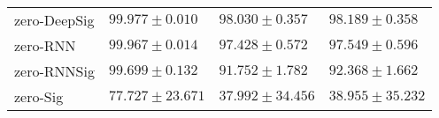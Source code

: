 \begin{tabular}{llll}
zero-DeepSig   &               $  \mathbf{ 99.977 \pm 0.010 } $ &                           $ 98.030 \pm 0.357 $ &                           $ 98.189 \pm 0.358 $ \\
zero-RNN       &                           $ 99.967 \pm 0.014 $ &                           $ 97.428 \pm 0.572 $ &                           $ 97.549 \pm 0.596 $ \\
zero-RNNSig    &                           $ 99.699 \pm 0.132 $ &                           $ 91.752 \pm 1.782 $ &                           $ 92.368 \pm 1.662 $ \\
zero-Sig       &                          $ 77.727 \pm 23.671 $ &                          $ 37.992 \pm 34.456 $ &                          $ 38.955 \pm 35.232 $ \\
\bottomrule
\end{tabular}
